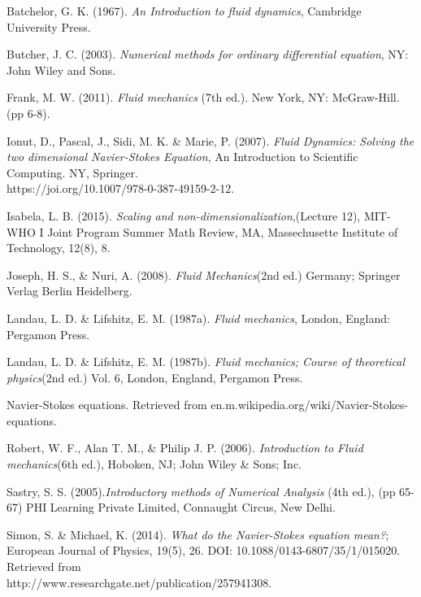 \documentclass[11pt]{report}
\begin{document}
	\begin{description}
		\item Batchelor, G. K. (1967). \emph{An Introduction to fluid dynamics}, Cambridge University Press.
		
		\item Butcher, J. C. (2003). \emph{Numerical methods for ordinary differential equation}, NY: John Wiley and Sons.
		
		\item Frank, M. W. (2011). \emph{Fluid mechanics} (7th ed.). New York, NY: McGraw-Hill. (pp 6-8).
		
		\item Ionut, D., Pascal, J., Sidi, M. K. \& Marie, P. (2007). \emph{Fluid Dynamics: Solving the two dimensional Navier-Stokes Equation}, An Introduction to Scientific Computing. NY, Springer.\\
		https://joi.org/10.1007/978-0-387-49159-2-12.
		
		\item Isabela, L. B. (2015). \emph{Scaling and non-dimensionalization},(Lecture 12), MIT-WHO I Joint Program Summer Math Review, MA, Massechusette Institute of Technology, 12(8), 8.
		
		\item Joseph, H. S., \& Nuri, A. (2008). \emph{Fluid Mechanics}(2nd ed.) Germany; Springer Verlag Berlin Heidelberg.
		
		\item Landau, L. D. \& Lifshitz, E. M. (1987a). \emph{Fluid mechanics}, London, England: Pergamon Press.
		
		\item  Landau, L. D. \& Lifshitz, E. M. (1987b). \emph{Fluid mechanics; Course of theoretical physics}(2nd ed.) Vol. 6, London, England, Pergamon Press.
		
		\item Navier-Stokes equations. Retrieved from en.m.wikipedia.org/wiki/Navier-Stokes-equations.
		
		\item Robert, W. F., Alan T. M., \& Philip J. P. (2006). \emph{Introduction to Fluid mechanics}(6th ed.), Hoboken, NJ; John Wiley \& Sons; Inc.
		
		\item Sastry, S. S. (2005).\emph{Introductory methods of Numerical Analysis} (4th ed.), (pp 65-67) PHI Learning Private Limited, Connaught Circus, New Delhi.
		
		\item Simon, S. \& Michael, K. (2014). \emph{What do the Navier-Stokes equation mean?}; European Journal of Physics, 19(5), 26. DOI: 10.1088/0143-6807/35/1/015020. Retrieved from \\
		http://www.researchgate.net/publication/257941308.
		

\end{description}
\end{document}
